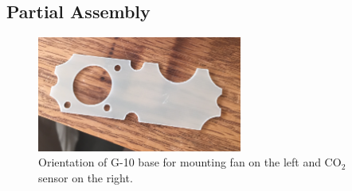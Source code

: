 \documentclass[letterpaper,12pt]{article}
\begin{document}
\subsection{Partial Assembly}
	\begin{figure} [h]
		\centering
		\includegraphics[width=0.6\textwidth]{g10_1.png}
		\caption{Orientation of G-10 base for mounting fan on the left and CO$_2$ sensor on the right.}
		\label{fig:g10-fan}
	\end{figure}
\end{document}
